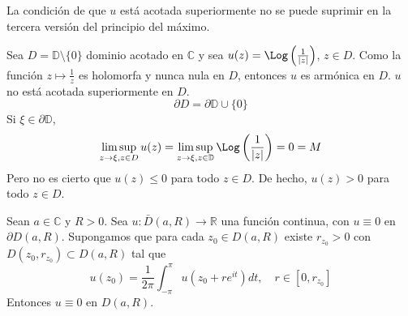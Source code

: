 \begin{remark}
    La condición de que $u$ está acotada superiormente no se puede suprimir en la tercera versión del principio del máximo.
\end{remark}

\begin{example}
    Sea $D = \mathbb{D} \setminus \{0\}$ dominio acotado en $\mathbb{C}$ y sea $u(z) = \Log\left(\frac{1}{|z|}\right)$, $z \in D$.
    Como la función $z \mapsto \frac{1}{z}$ es holomorfa y nunca nula en $D$, entonces $u$ es armónica en $D$.
    $u$ no está acotada superiormente en $D$.
    $$\partial D = \partial\mathbb{D} \cup \{0\}$$
    Si $\xi \in \partial\mathbb{D}$,
    $$\limsup_{z \to \xi, z \in D} u(z) = \limsup_{z \to \xi, z \in \mathbb{D}} \Log\left(\frac{1}{|z|}\right) = 0 = M$$
    Pero no es cierto que $u(z) \leq 0$ para todo $z \in D$.
    De hecho, $u(z) > 0$ para todo $z \in D$.
\end{example}

\begin{lemma}
    Sean $a \in \mathbb{C}$ y $R > 0$.
    Sea $u: \bar{D}(a, R) \to \mathbb{R}$ una función continua, con $u \equiv 0$ en $\partial D(a, R)$.
    Supongamos que para cada $z_0 \in D(a, R)$ existe $r_{z_0} > 0$ con $D(z_0, r_{z_0}) \subset D(a, R)$ tal que
    $$u(z_0) = \frac{1}{2\pi} \int_{-\pi}^\pi u(z_0 + re^{it})dt, \quad r \in [0, r_{z_0}]$$
    Entonces $u \equiv 0$ en $D(a, R)$.
\end{lemma}

